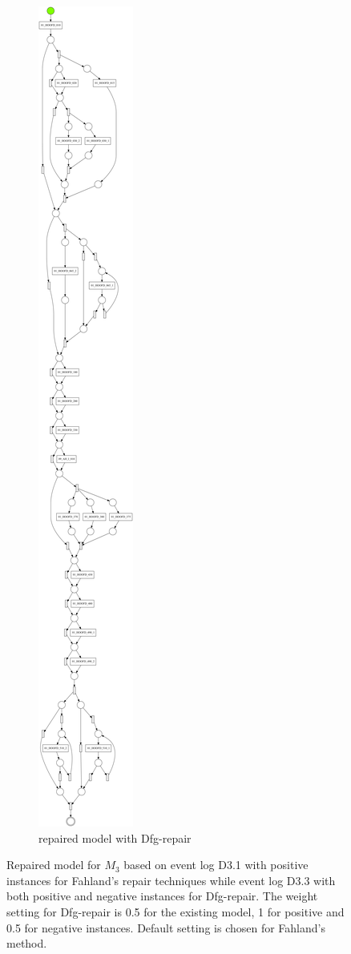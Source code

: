 \begin{figure}[htp]
\begin{subfigure}[b]{0.43\textwidth}
		\includegraphics[width=.9\textwidth, height=0.9\textheight]{figures/evaluation/PN-result-D4-3-M3-dfg-05-1-05.pdf}
		\caption{repaired model with Dfg-repair}
		\label{fig:rl_dfg}
	\end{subfigure}
	\caption[Repaired models with Fahland and Dfg-repair techniques]{Repaired model for $M_3$ based on event log D3.1 with positive instances for Fahland's repair techniques  while event log D3.3 with both positive and negative instances for Dfg-repair. The weight setting for Dfg-repair is 0.5 for the existing model, 1 for positive and 0.5 for negative instances. Default setting is chosen for Fahland's method.}
\end{figure}


